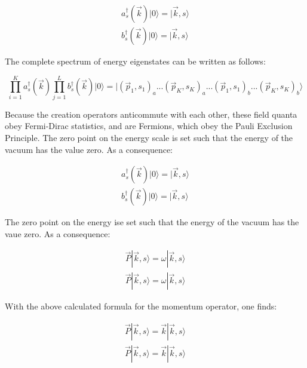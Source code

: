 \documentclass[a4]{article}
\begin{document}
    \begin{equation}
        \begin{aligned}
            a_s^{\dagger} (\vec{k}) | 0 \rangle = | \vec{k}, s \rangle \\
            b_s^{\dagger} (\vec{k}) | 0 \rangle = | \vec{k}, s \rangle
        \end{aligned}
    \end{equation}

    The complete spectrum of energy eigenstates can be written as follows:

    \begin{equation}
        \prod_{i = 1}^{K} a_s^{\dagger} (\vec{k}) \prod_{j = 1}^{L} b_s^{\dagger} (\vec{k}) | 0 \rangle = | (\vec{p}_1, s_1)_a ... (\vec{p}_K, s_K)_a ... (\vec{p}_1, s_1)_b ... (\vec{p}_K, s_K)_b \rangle
    \end{equation}

    Because the creation operators anticommute with each other, these field quanta obey Fermi-Dirac statistics, and are Fermions, which obey the Pauli Exclusion Principle. The zero point on the energy scale
    is set such that the energy of the vacuum has the value zero. As a consequence:

    \begin{equation}
        \begin{aligned}
            a_s^{\dagger} (\vec{k}) | 0 \rangle = | \vec{k}, s \rangle \\
            b_s^{\dagger} (\vec{k}) | 0 \rangle = | \vec{k}, s \rangle
        \end{aligned}
    \end{equation}

    The zero point on the energy ise set such that the energy of the vacuum has the vaue zero. As a consequence:

    \begin{equation}
        \begin{aligned}
            \vec{P} | \vec{k}, s \rangle = \omega | \vec{k}, s \rangle \\
            \vec{P} | \vec{k}, s \rangle = \omega | \vec{k}, s \rangle
        \end{aligned}
    \end{equation}

    With the above calculated formula for the momentum operator, one finds:

    \begin{equation}
        \begin{aligned}
            \vec{P} | \vec{k}, s \rangle = \vec{k} | \vec{k}, s \rangle \\
            \vec{P} | \vec{k}, s \rangle = \vec{k} | \vec{k}, s \rangle
        \end{aligned}
    \end{equation}
\end{document}
